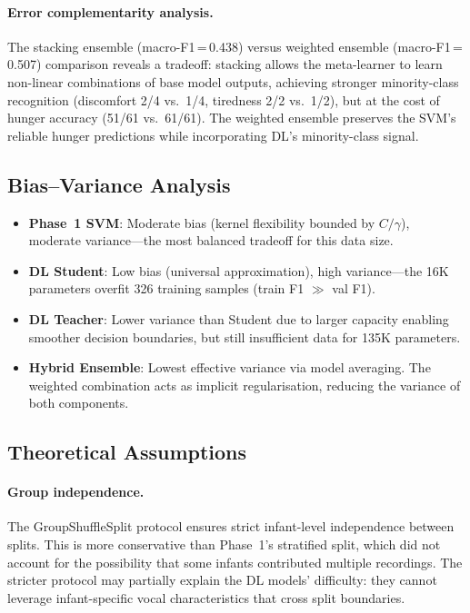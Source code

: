 \documentclass[11pt,a4paper]{article}
\begin{document}
\paragraph{Error complementarity analysis.}
The stacking ensemble (macro-F1\,=\,0.438) versus weighted ensemble
(macro-F1\,=\,0.507) comparison reveals a tradeoff: stacking allows the
meta-learner to learn non-linear combinations of base model outputs,
achieving stronger minority-class recognition (discomfort 2/4 vs.\ 1/4,
tiredness 2/2 vs.\ 1/2), but at the cost of hunger accuracy
(51/61 vs.\ 61/61). The weighted ensemble preserves the SVM's reliable
hunger predictions while incorporating DL's minority-class signal.

\subsection{Bias--Variance Analysis}

\begin{itemize}[nosep]
  \item \textbf{Phase~1 SVM}: Moderate bias (kernel flexibility bounded
        by $C/\gamma$), moderate variance---the most balanced tradeoff
        for this data size.
  \item \textbf{DL Student}: Low bias (universal approximation), high
        variance---the 16K parameters overfit 326 training samples
        (train F1 $\gg$ val F1).
  \item \textbf{DL Teacher}: Lower variance than Student due to larger
        capacity enabling smoother decision boundaries, but still
        insufficient data for 135K parameters.
  \item \textbf{Hybrid Ensemble}: Lowest effective variance via model
        averaging. The weighted combination acts as implicit
        regularisation, reducing the variance of both components.
\end{itemize}

\subsection{Theoretical Assumptions}

\paragraph{Group independence.}
The GroupShuffleSplit protocol ensures strict infant-level independence
between splits. This is more conservative than Phase~1's stratified
split, which did not account for the possibility that some infants
contributed multiple recordings. The stricter protocol may partially
explain the DL models' difficulty: they cannot leverage
infant-specific vocal characteristics that cross split boundaries.
\end{document}
